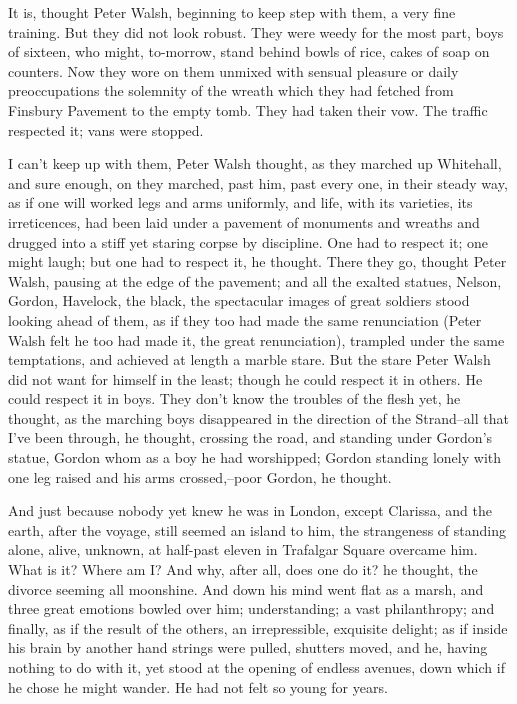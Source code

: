 \documentclass[lang=cn,10pt]{elegantbook}
\begin{document}
It is, thought Peter Walsh, beginning to keep step with them, a
very fine training.  But they did not look robust.  They were weedy
for the most part, boys of sixteen, who might, to-morrow, stand
behind bowls of rice, cakes of soap on counters.  Now they wore on
them unmixed with sensual pleasure or daily preoccupations the
solemnity of the wreath which they had fetched from Finsbury
Pavement to the empty tomb.  They had taken their vow.  The traffic
respected it; vans were stopped.

I can't keep up with them, Peter Walsh thought, as they marched up
Whitehall, and sure enough, on they marched, past him, past every
one, in their steady way, as if one will worked legs and arms
uniformly, and life, with its varieties, its irreticences, had been
laid under a pavement of monuments and wreaths and drugged into a
stiff yet staring corpse by discipline.  One had to respect it; one
might laugh; but one had to respect it, he thought.  There they go,
thought Peter Walsh, pausing at the edge of the pavement; and all
the exalted statues, Nelson, Gordon, Havelock, the black, the
spectacular images of great soldiers stood looking ahead of them,
as if they too had made the same renunciation (Peter Walsh felt he
too had made it, the great renunciation), trampled under the same
temptations, and achieved at length a marble stare.  But the stare
Peter Walsh did not want for himself in the least; though he could
respect it in others.  He could respect it in boys.  They don't
know the troubles of the flesh yet, he thought, as the marching
boys disappeared in the direction of the Strand--all that I've been
through, he thought, crossing the road, and standing under Gordon's
statue, Gordon whom as a boy he had worshipped; Gordon standing
lonely with one leg raised and his arms crossed,--poor Gordon, he
thought.

And just because nobody yet knew he was in London, except Clarissa,
and the earth, after the voyage, still seemed an island to him, the
strangeness of standing alone, alive, unknown, at half-past eleven
in Trafalgar Square overcame him.  What is it?  Where am I?  And
why, after all, does one do it? he thought, the divorce seeming all
moonshine.  And down his mind went flat as a marsh, and three great
emotions bowled over him; understanding; a vast philanthropy; and
finally, as if the result of the others, an irrepressible,
exquisite delight; as if inside his brain by another hand strings
were pulled, shutters moved, and he, having nothing to do with it,
yet stood at the opening of endless avenues, down which if he chose
he might wander.  He had not felt so young for years.
\end{document}
